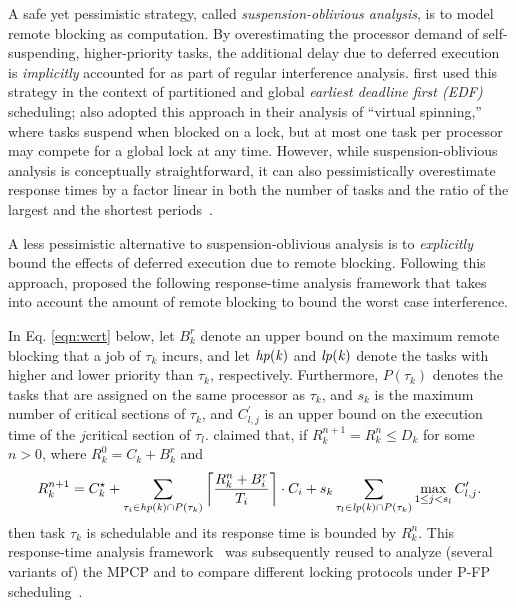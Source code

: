 A safe yet pessimistic strategy, called \emph{suspension-oblivious analysis}, is to model remote blocking as computation. By overestimating the processor demand of self-suspending, higher-priority tasks, the additional delay due to deferred execution is \emph{implicitly} accounted for as part of regular interference analysis. \cite{block-2007} first used this strategy in the context of partitioned and global \emph{earliest deadline first (EDF)} scheduling;  \cite{lakshmanan-2009} also adopted this approach in their analysis of ``virtual spinning,'' where tasks suspend when blocked on a lock, but at most one task per processor may compete for a global lock at any time. However, while suspension-oblivious analysis is conceptually straightforward, it can also pessimistically overestimate response times by a factor linear in both the number of tasks and the ratio of the largest and the shortest periods~\cite{wieder-2013}.

A less pessimistic alternative to suspension-oblivious analysis is to \emph{explicitly} bound the effects of deferred execution due to remote blocking. Following this approach, \cite{lakshmanan-2009} proposed the following response-time analysis framework that takes into account the amount of remote blocking to bound the worst case interference.

In Eq. \ref{eqn:wcrt} below, let $B_k^r$ denote an upper bound on the maximum remote blocking that a job of $\tau_k$ incurs, and let $\mathit{hp(k)}$ and $\mathit{lp(k)}$ denote the tasks with higher and lower priority than $\tau_k$, respectively. Furthermore, $P(\tau_k)$ denotes the tasks that are assigned on the same processor as $\tau_k$, and $s_k$ is the maximum number of critical sections of $\tau_k$, and $C_{l,j}^{\prime}$ is an upper bound on the execution time of the $j$\xth critical section of $\tau_l$. \cite{lakshmanan-2009} claimed that, if $R_k^{n+1} = R_k^n \leq D_k$ for some $n > 0$, where $R_k^0 = C_k + B_k^r$ and
\begin{equation}
\label{eqn:wcrt}
R_k^{n+1} = C_k^{\star} + \sum_{\tau_i \in \mathit{hp(k)} \cap P(\tau_k)} \left \lceil \frac{R_k^n + B_i^r}{T_i} \right \rceil \cdot C_i + s_k \sum_{\tau_l \in \mathit{lp(k)} \cap P(\tau_k)} \max_{1 \leq j < s_l} C_{l,j}^{\prime}.  
\end{equation}
then task $\tau_k$ is schedulable and its response time is bounded by $R_k^n$. This  response-time analysis framework~\cite{lakshmanan-2009} was subsequently reused to analyze (several variants of) the MPCP \cite{yang-2013,kim-2014,carminati-2014,yang-2014}  and to compare  different locking protocols under P-FP scheduling~\cite{zeng-2011,bbb-2013,han-2014}.

